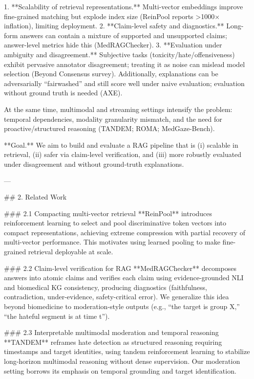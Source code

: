 1. **Scalability of retrieval representations.** Multi-vector embeddings improve fine-grained matching but explode index size (ReinPool reports >1000× inflation), limiting deployment.  
2. **Claim-level safety and diagnostics.** Long-form answers can contain a mixture of supported and unsupported claims; answer-level metrics hide this (MedRAGChecker).  
3. **Evaluation under ambiguity and disagreement.** Subjective tasks (toxicity/hate/offensiveness) exhibit pervasive annotator disagreement; treating it as noise can mislead model selection (Beyond Consensus survey). Additionally, explanations can be adversarially “fairwashed” and still score well under naive evaluation; evaluation without ground truth is needed (AXE).  

At the same time, multimodal and streaming settings intensify the problem: temporal dependencies, modality granularity mismatch, and the need for proactive/structured reasoning (TANDEM; ROMA; MedGaze-Bench).

**Goal.** We aim to build and evaluate a RAG pipeline that is (i) scalable in retrieval, (ii) safer via claim-level verification, and (iii) more robustly evaluated under disagreement and without ground-truth explanations.

---

## 2. Related Work  

### 2.1 Compacting multi-vector retrieval  
**ReinPool** introduces reinforcement learning to select and pool discriminative token vectors into compact representations, achieving extreme compression with partial recovery of multi-vector performance. This motivates using learned pooling to make fine-grained retrieval deployable at scale.

### 2.2 Claim-level verification for RAG  
**MedRAGChecker** decomposes answers into atomic claims and verifies each claim using evidence-grounded NLI and biomedical KG consistency, producing diagnostics (faithfulness, contradiction, under-evidence, safety-critical error). We generalize this idea beyond biomedicine to moderation-style outputs (e.g., “the target is group X,” “the hateful segment is at time t”).

### 2.3 Interpretable multimodal moderation and temporal reasoning  
**TANDEM** reframes hate detection as structured reasoning requiring timestamps and target identities, using tandem reinforcement learning to stabilize long-horizon multimodal reasoning without dense supervision. Our moderation setting borrows its emphasis on temporal grounding and target identification.

